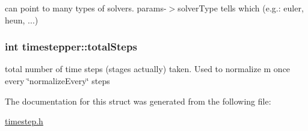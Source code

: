 can point to many types of solvers. params-\/$>$solverType tells which (e.g.: euler, heun, ...) 

\hypertarget{structtimestepper_ae00738ade828402f52973bddb26ad0ec}{
\subsubsection[{totalSteps}]{\setlength{\rightskip}{0pt plus 5cm}int {\bf timestepper::totalSteps}}}
\label{structtimestepper_ae00738ade828402f52973bddb26ad0ec}


total number of time steps (stages actually) taken. Used to normalize m once every \char`\"{}normalizeEvery\char`\"{} steps 



The documentation for this struct was generated from the following file:\begin{DoxyCompactItemize}
\item 
\hyperlink{timestep_8h}{timestep.h}\end{DoxyCompactItemize}
